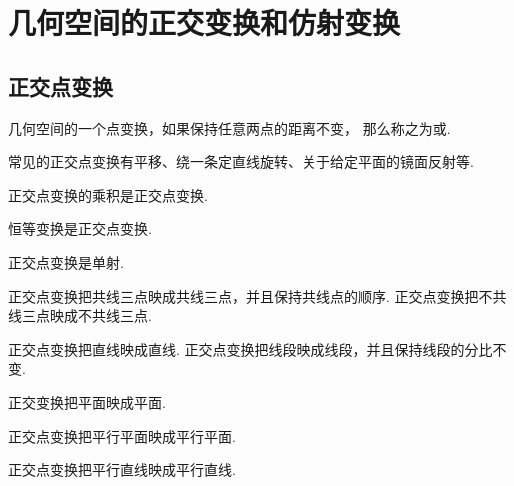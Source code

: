 \section{几何空间的正交变换和仿射变换}
\subsection{正交点变换}
\begin{definition}
几何空间的一个点变换，如果保持任意两点的距离不变，
那么称之为或.
\end{definition}

常见的正交点变换有平移、绕一条定直线旋转、关于给定平面的镜面反射等.

\begin{property}
正交点变换的乘积是正交点变换.
\end{property}

\begin{property}
恒等变换是正交点变换.
\end{property}

\begin{property}
正交点变换是单射.
\end{property}

\begin{property}
正交点变换把共线三点映成共线三点，并且保持共线点的顺序.
正交点变换把不共线三点映成不共线三点.
\end{property}

\begin{property}
正交点变换把直线映成直线.
正交点变换把线段映成线段，并且保持线段的分比不变.
\end{property}

\begin{property}
正交变换把平面映成平面.
\end{property}

\begin{property}
正交点变换把平行平面映成平行平面.
\end{property}

\begin{property}
正交点变换把平行直线映成平行直线.
\end{property}

